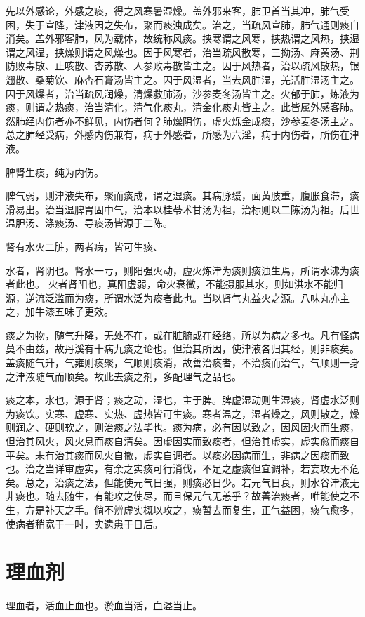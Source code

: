 \documentclass[UTF8]{ctexart}
\begin{document}
先以外感论，外感之痰，得之风寒暑湿燥。盖外邪来客，肺卫首当其冲，肺气受困，失于宣降，津液因之失布，聚而痰浊成矣。治之，当疏风宣肺，肺气通则痰自消矣。盖外邪客肺，风为载体，故统称风痰。挟寒谓之风寒，挟热谓之风热，挟湿谓之风湿，挟燥则谓之风燥也。因于风寒者，治当疏风散寒，三拗汤、麻黄汤、荆防败毒散、止咳散、杏苏散、人参败毒散皆主之。因于风热者，治以疏风散热，银翘散、桑菊饮、麻杏石膏汤皆主之。因于风湿者，当去风胜湿，羌活胜湿汤主之。因于风燥者，治当疏风润燥，清燥救肺汤，沙参麦冬汤皆主之。火郁于肺，炼液为痰，则谓之热痰，治当清化，清气化痰丸，清金化痰丸皆主之。此皆属外感客肺。然肺经内伤者亦不鲜见，内伤者何？肺燥阴伤，虚火烁金成痰，沙参麦冬汤主之。总之肺经受病，外感内伤兼有，病于外感者，所感为六淫，病于内伤者，所伤在津液。

脾肾生痰，纯为内伤。

脾气弱，则津液失布，聚而痰成，谓之湿痰。其病脉缓，面黄肢重，腹胀食滞，痰滑易出。治当温脾胃固中气，治本以桂苓术甘汤为祖，治标则以二陈汤为祖。后世温胆汤、涤痰汤、导痰汤皆源于二陈。

肾有水火二脏，两者病，皆可生痰、

水者，肾阴也。肾水一亏，则阳强火动，虚火炼津为痰则痰浊生焉，所谓水沸为痰者此也。  火者肾阳也，真阳虚弱，命火衰微，不能摄服其水，则如洪水不能归源，逆流泛滥而为痰，所谓水泛为痰者此也。当以肾气丸益火之源。八味丸亦主之，加牛漆五味子更效。

痰之为物，随气升降，无处不在，或在脏腑或在经络，所以为病之多也。凡有怪病莫不由兹，故丹溪有十病九痰之论也。但治其所因，使津液各归其经，则非痰矣。盖痰随气升，气雍则痰聚，气顺则痰消，故善治痰者，不治痰而治气，气顺则一身之津液随气而顺矣。故此去痰之剂，多配理气之品也。

痰之本，水也，源于肾；痰之动，湿也，主于脾。脾虚湿动则生湿痰，肾虚水泛则为痰饮。实寒、虚寒、实热、虚热皆可生痰。寒者温之，湿者燥之，风则散之，燥则润之、硬则软之，则治痰之法毕也。痰为病，必有因以致之，因风因火而生痰，但治其风火，风火息而痰自清矣。因虚因实而致痰者，但治其虚实，虚实愈而痰自平矣。未有治其痰而风火自撤，虚实自调者。以痰必因病而生，非病之因痰而致也。治之当详审虚实，有余之实痰可行消伐，不足之虚痰但宜调补，若妄攻无不危矣。总之，治痰之法，但能使元气日强，则痰必日少。若元气日衰，则水谷津液无非痰也。随去随生，有能攻之使尽，而且保元气无恙乎？故善治痰者，唯能使之不生，方是补天之手。倘不辨虚实概以攻之，痰暂去而复生，正气益困，痰气愈多，使病者稍宽于一时，实遗患于日后。

\section{理血剂}
理血者，活血止血也。淤血当活，血溢当止。
\end{document}
